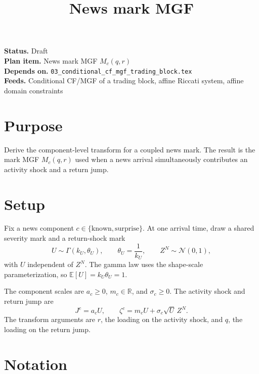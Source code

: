 \documentclass[11pt]{article}
\title{News mark MGF}
\author{}
\date{}
\begin{document}
\maketitle

\noindent\textbf{Status.} Draft\\
\textbf{Plan item.} News mark MGF \(M_c(q,r)\)\\
\textbf{Depends on.} \texttt{03\_conditional\_cf\_mgf\_trading\_block.tex}\\
\textbf{Feeds.} Conditional CF/MGF of a trading block, affine Riccati system, affine domain constraints

\section{Purpose}

Derive the component-level transform for a coupled news mark.
The result is the mark MGF \(M_c(q,r)\) used when a news arrival
simultaneously contributes an activity shock and a return jump.

\section{Setup}

Fix a news component \(c\in\{\mathrm{known},\mathrm{surprise}\}\).
At one arrival time, draw a shared severity mark and a return-shock mark
\[
    U\sim\Gamma(k_U,\theta_U),
    \qquad
    \theta_U=\frac{1}{k_U},
    \qquad
    Z^N\sim\mathcal N(0,1),
\]
with \(U\) independent of \(Z^N\).
The gamma law uses the shape-scale parameterization,
so \(\mathbb E[U]=k_U\theta_U=1\).

The component scales are \(a_c\ge0\), \(m_c\in\mathbb R\), and
\(\sigma_c\ge0\).
The activity shock and return jump are
\[
    J^c=a_c U,
    \qquad
    \zeta^c=m_c U+\sigma_c\sqrt{U}\,Z^N.
\]
The transform arguments are \(r\), the loading on the activity shock, and
\(q\), the loading on the return jump.

\section{Notation}
\end{document}
